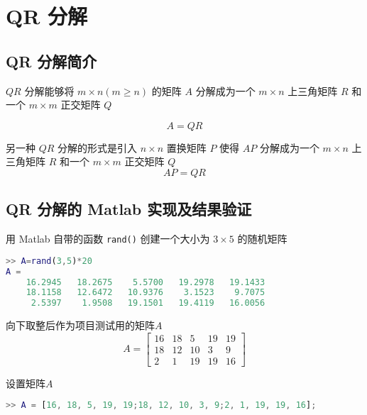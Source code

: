 \chapter{QR 分解}
\section{QR 分解简介}
$QR$ 分解能够将 $m\times n (m\geq n)$ 的矩阵 $A$ 分解成为一个 $m\times n$ 上三角矩阵 $R$ 和一个 $m\times m$ 正交矩阵 $Q$

\begin{equation}
    A = QR
    \label{QR-decomposition}
\end{equation}

另一种 $QR$ 分解的形式是引入 $n\times n$ 置换矩阵 $P$ 使得 $AP$ 分解成为一个 $m\times n$ 上三角矩阵 $R$ 和一个 $m\times m$ 正交矩阵 $Q$
\begin{equation}
    AP = QR
    \label{QRP-decomposition}
\end{equation}

\section{QR 分解的 Matlab 实现及结果验证}
用 Matlab 自带的函数 \lstinline|rand()| 创建一个大小为 $3\times 5$ 的随机矩阵

\begin{lstlisting}[language=Matlab]  
>> A=rand(3,5)*20
A =
    16.2945   18.2675    5.5700   19.2978   19.1433
    18.1158   12.6472   10.9376    3.1523    9.7075
     2.5397    1.9508   19.1501   19.4119   16.0056
\end{lstlisting}


向下取整后作为项目测试用的矩阵$A$
\begin{equation}
    A=\begin{bmatrix}
        16&   18&    5&   19&   19\\
        18&   12&   10&    3&    9\\
        2&    1&   19&   19&   16
    \end{bmatrix}
\end{equation}






设置矩阵$A$
\begin{lstlisting}[language=Matlab]  
>> A = [16, 18, 5, 19, 19;18, 12, 10, 3, 9;2, 1, 19, 19, 16];
\end{lstlisting}

